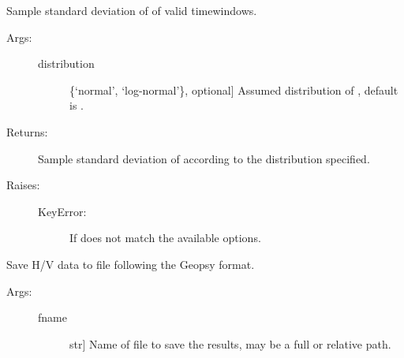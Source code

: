\documentclass[letterpaper,10pt,english,openany,oneside]{sphinxmanual}
\begin{document}
\begin{fulllineitems}
\begin{fulllineitems}
\begin{description}
\end{description}

\end{fulllineitems}


\begin{fulllineitems}
\label{\detokenize{index:hvsrpy.Hvsr.std_f0_frq}}
Sample standard deviation of  of valid timewindows.
\begin{description}
\item[{Args:}] \leavevmode\begin{description}
\item[{distribution}] \leavevmode{[}\{‘normal’, ‘log-normal’\}, optional{]}
Assumed distribution of , default is .

\end{description}

\item[{Returns:}] \leavevmode
Sample standard deviation of  according to the 
distribution specified.

\item[{Raises:}] \leavevmode\begin{description}
\item[{KeyError:}] \leavevmode
If  does not match the available options.

\end{description}

\end{description}

\end{fulllineitems}


\begin{fulllineitems}
\label{\detokenize{index:hvsrpy.Hvsr.to_file_like_geopsy}}
Save H/V data to file following the Geopsy format.
\begin{description}
\item[{Args:}] \leavevmode\begin{description}
\item[{fname}] \leavevmode{[}str{]}
Name of file to save the results, may be a full or
relative path.


\end{description}
\end{description}
\end{fulllineitems}
\end{fulllineitems}
\end{document}
